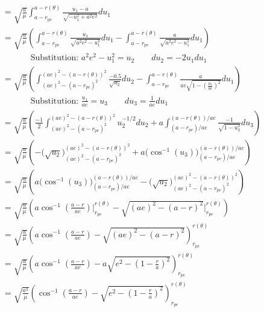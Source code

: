 \documentclass{article}
\begin{document}
\begin{align*}
        & =\sqrt{\frac{a}{\mu}}\int_{a-r_\text{pe}}^{a-r(\theta)}\frac{u_1-a}{\sqrt{-u_1^2+a^2e^2}}du_1                                                                                                                  \\
        & =\sqrt{\frac{a}{\mu}}\left(\int_{a-r_\text{pe}}^{a-r(\theta)}\frac{u_1}{\sqrt{a^2e^2-u_1^2}}du_1-\int_{a-r_\text{pe}}^{a-r(\theta)}\frac{a}{\sqrt{a^2e^2-u_1^2}}du_1\right)                                    \\
        & \phantom{=}\qquad{}\text{Substitution: }a^2e^2-u_1^2=u_2\qquad{}du_2=-2u_1du_1                                                                                                                                 \\
        & =\sqrt{\frac{a}{\mu}}\left(\int_{(ae)^2-(a-r_\text{pe})^2}^{(ae)^2-(a-r(\theta))^2}\frac{-0.5}{\sqrt{u_2}}du_2-\int_{a-r_\text{pe}}^{a-r(\theta)}\frac{a}{ae\sqrt{1-\left(\frac{u_1}{ae}\right)^2}}du_1\right) \\
        & \phantom{=}\qquad{}\text{Substitution: }\frac{u_1}{ae}=u_3\qquad{}du_3=\frac{1}{ae}du_1                                                                                                                        \\
        & =\sqrt{\frac{a}{\mu}}\left(\frac{-1}{2}\int_{(ae)^2-(a-r_\text{pe})^2}^{(ae)^2-(a-r(\theta))^2}u_2^{-1/2}du_2+a\int_{(a-r_\text{pe})/ae}^{(a-r(\theta))/ae}\frac{-1}{\sqrt{1-u_3^2}}du_3\right)                \\
        & =\sqrt{\frac{a}{\mu}}\left(-\Big(\sqrt{u_2}\Big)_{(ae)^2-(a-r_\text{pe})^2}^{(ae)^2-(a-r(\theta))^2}+a\Big(\cos^{-1}(u_3)\Big)_{(a-r_\text{pe})/ae}^{(a-r(\theta))/ae}\right)                                  \\
        & =\sqrt{\frac{a}{\mu}}\left(a\Big(\cos^{-1}(u_3)\Big)_{(a-r_\text{pe})/ae}^{(a-r(\theta))/ae}-\Big(\sqrt{u_2}\Big)_{(ae)^2-(a-r_\text{pe})^2}^{(ae)^2-(a-r(\theta))^2}\right)                                   \\
        & =\sqrt{\frac{a}{\mu}}\left(a\cos^{-1}\left(\frac{a-r}{ae}\right)\Big|_{r_\text{pe}}^{r(\theta)}-\sqrt{(ae)^2-(a-r)^2}\Big|_{r_\text{pe}}^{r(\theta)}\right)                                                    \\
        & =\sqrt{\frac{a}{\mu}}\left(a\cos^{-1}\left(\frac{a-r}{ae}\right)-\sqrt{(ae)^2-(a-r)^2}\right)_{r_\text{pe}}^{r(\theta)}                                                                                        \\
        & =\sqrt{\frac{a}{\mu}}\left(a\cos^{-1}\left(\frac{a-r}{ae}\right)-a\sqrt{e^2-\left(1-\frac{r}{a}\right)^2}\right)_{r_\text{pe}}^{r(\theta)}                                                                     \\
        & =\sqrt{\frac{a^3}{\mu}}\left(\cos^{-1}\left(\frac{a-r}{ae}\right)- \sqrt{e^2-\left(1-\frac{r}{a}\right)^2}\right)_{r_\text{pe}}^{r(\theta)}                                                                    \\
\end{align*}
\end{document}

